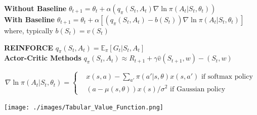 \documentclass[10pt,landscape]{article}
\begin{document}
\begin{multicols}{3}
\textbf{Without Baseline} $\theta_{t+1} = \theta_t + \alpha(q_\pi(S_t, A_t) \nabla \ln \pi(A_t | S_t, \theta_t))$ \\
\textbf{With Baseline} $\theta_{t+1} = \theta_t + \alpha[(q_\pi(S_t, A_t) - b(S_t)) \nabla \ln \pi(A_t | S_t, \theta_t)]$ where, typically $b(S_t) = \hat{v}(S_t)$

\textbf{REINFORCE} $q_\pi(S_t, A_t) = \mathbb{E}_\pi [G_t | S_t, A_t]$ \\

\textbf{Actor-Critic Methods} $q_\pi(S_t, A_t) \approx R_{t+1} + \gamma \hat{v}(S_{t+1}, w) - (S_{t}, w)$


$$\nabla \ln \pi(A_t | S_t, \theta_t) = \begin{cases}& x(s,a) - \sum_{a'} \pi(a' | s, \theta) x(s, a') \text{ if softmax policy } \\ & (a - \mu(s, \theta)) x(s)/\sigma^2 \text{ if Gaussian policy }\end{cases}$$

\begin{center}
\texttt{[image: ./images/Tabular\_Value\_Function.png]}
\end{center}
\end{multicols}
\end{document}
